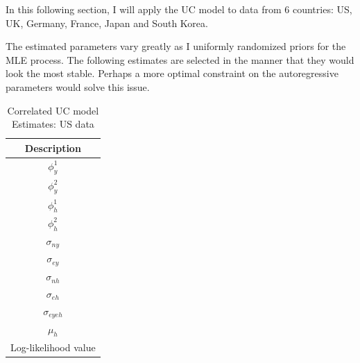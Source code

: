 \documentclass[fleqn]{article}
\begin{document}
\begin{outline}[enumerate]
In this following section, I will apply the UC model to data from 6 countries: US, UK, Germany, France, Japan and South Korea.

The estimated parameters vary greatly as I uniformly randomized priors for the MLE process. The following estimates are selected in the manner that they would look the most stable. Perhaps a more optimal constraint on the autoregressive parameters would solve this issue.

\pagebreak


\begin{table}
	\begin{center}
	\caption{Correlated UC model Estimates: US data}
	\begin{tabular}{c}
		\toprule
		Description\\
		\midrule
		$\phi^1_{y}$ \\
		$\phi^2_{y}$ \\		
		$\phi^1_{h}$ \\
		$\phi^2_{h}$ \\		
		$\sigma_{ny}$\\ 
		$\sigma_{ey}$\\
		$\sigma_{nh}$\\
		$\sigma_{eh}$\\
		$\sigma_{eyeh}$\\
		$\mu_h$\\
		Log-likelihood value\\
		\bottomrule
	\end{tabular}%
	\end{center}
\end{table}


\end{outline}
\end{document}
